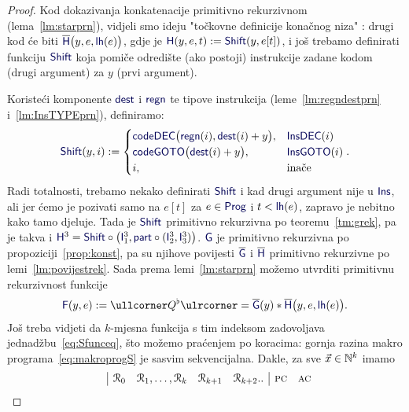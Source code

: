 \begin{proof}
Kod dokazivanja konkatenacije primitivno rekurzivnom (lema~\ref{lm:starprn}), vidjeli smo ideju "točkovne definicije konačnog niza"%
: drugi kod će biti $\overline{\f H}\bigl(y,e,\f{lh}(e)\bigr)$, gdje je $\f H(y,e,t):=\f{Shift}(y,e[t])$, i još trebamo definirati funkciju $\f{Shift}$ koja pomiče odredište (ako postoji) instrukcije zadane kodom (drugi argument) za $y$ (prvi argument).

Koristeći komponente $\f{dest}$ i $\f{regn}$ te tipove instrukcija (leme~\ref{lm:regndestprn} i~\ref{lm:InsTYPEprn}), definiramo:
\begin{equation}
    \f{Shift}(y,i):=\begin{cases}
        \f{codeDEC}\bigl(\f{regn}(i),\f{dest}(i)+y\bigr),&\f{InsDEC}(i)\\
        \f{codeGOTO}\bigl(\f{dest}(i)+y\bigr),&\f{InsGOTO}(i)\\
        i,&\text{inače}
    \end{cases}\text.
\end{equation}
    Radi totalnosti, trebamo nekako definirati $\f{Shift}$ i kad drugi argument nije u $\f{Ins}$, ali jer ćemo je pozivati samo na $e[t]$ za $e\in\f{Prog}$ i $t<\f{lh}(e)$, zapravo je nebitno kako tamo djeluje. Tada je $\f{Shift}$ primitivno rekurzivna po teoremu~\ref{tm:grek}, pa je takva i $\f H^3=\f{Shift}\circ\bigl(\f I_1^3,\f{part}\circ(\f I_2^3,\f I_3^3)\bigr)$. $\f G$ je primitivno rekurzivna po propoziciji~\ref{prop:konst}, pa su njihove povijesti $\overline{\f G}$ i $\overline{\f H}$ primitivno rekurzivne po lemi~\ref{lm:povijestrek}. Sada prema lemi~\ref{lm:starprn} %
 možemo utvrditi primitivnu rekurzivnost funkcije
\begin{equation}
    \f F(y,e):=\kprog{Q^\flat}=\overline{\f G}(y)*\overline{\f H}\bigl(y,e,\f{lh}(e)\bigr)\text.
\end{equation}
Još treba vidjeti da $k$-mjesna funkcija s tim indeksom zadovoljava jednadžbu~\eqref{eq:Sfunceq}, što možemo praćenjem po koracima: gornja razina makro programa~\eqref{eq:makroprogS} je sasvim sekvencijalna. Dakle, za sve $\vec x\in{\mathbb N}^k$ imamo
	\vspace{-1em}
\begin{equation}
    \begin{array}{r@{\;}l|cr@{,\dotsc,\,}lcc|cc}
        & & \reg0 & \reg1 & \reg k & \reg{k+1} & \reg{k+2}.. & \textsc{pc} & \textsc{ac}\\

\end{array}
\end{equation}
\end{proof}
